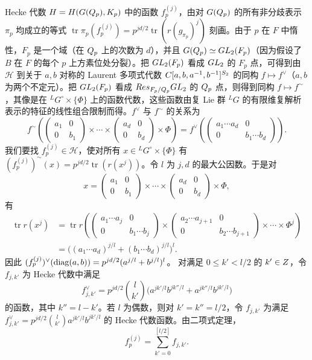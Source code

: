 Hecke 代数 $H=H(G(Q_p),K_p)$ 中的函数 $f_p^{(j)}$，由对 $G(Q_p)$ 的所有非分歧表示 $\pi_p$ 均成立的等式
$\operatorname{tr}\pi_p(f_p^{(j)})=p^{jd/2}\operatorname{tr}(r(g_{\pi_p})^j)$ 刻画。由于 $p$ 在 $F$ 中惰性，$F_p$ 是一个域（在 $Q_p$ 上的次数为 $d$），并且 $G(Q_p)\simeq GL_2(F_p)$（因为假设了 $B$ 在 $F$ 的每个 $p$ 上方素位处分裂）。把 $GL_2(F_p)$ 看成 $GL_2$ 的 $F_p$ 点，可得到由 $\mathcal H$ 到关于 $a,b$ 对称的 Laurent 多项式代数 $C[a,b,a^{-1},b^{-1}]^{S_2}$ 的同构 $f\mapsto f^\vee$（$a,b$ 为两个不定元）。把 $GL_2(F_p)$ 看成 $Res_{F_p/Q_p}GL_2$ 的 $Q_p$ 点，则得到同构 $f\mapsto f^\sim$，其像是在 ${}^LG^\circ\times\{\Phi\}$ 上的函数代数，这些函数由复 Lie 群 ${}^LG$ 的有限维复解析表示的特征的线性组合限制而得。$f^\vee$ 与 $f^\sim$ 的关系为
\[
f^\sim\left(\begin{pmatrix}a_1&0\\0&b_1\end{pmatrix}\times\cdots\times
\begin{pmatrix}a_d&0\\0&b_d\end{pmatrix}\times\Phi\right)
=f^\vee\left(\begin{pmatrix}a_1\cdots a_d&0\\0&b_1\cdots b_d\end{pmatrix}\right).
\]
我们要找 $f_p^{(j)}\in\mathcal H$，使对所有 $x\in{}^LG^\circ\times\{\Phi\}$ 有
$(f_p^{(j)})^\sim(x)=p^{jd/2}\operatorname{tr}(r(x^j))$。令 $l$ 为 $j,d$ 的最大公因数。于是对
\[
x=\begin{pmatrix}a_1&0\\0&b_1\end{pmatrix}\times\cdots\times
\begin{pmatrix}a_d&0\\0&b_d\end{pmatrix}\times\Phi,
\]
有
\begin{align*}
\operatorname{tr}r(x^j)&=\operatorname{tr}r\left(
\begin{pmatrix}a_1\cdots a_j&0\\0&b_1\cdots b_j\end{pmatrix}
\times\begin{pmatrix}a_2\cdots a_{j+1}&0\\0&b_2\cdots b_{j+1}\end{pmatrix}
\times\cdots\times\Phi^j\right)\\
&=\big((a_1\cdots a_d)^{j/l}+(b_1\cdots b_d)^{j/l}\big)^l.
\end{align*}
因此
$(f_p^{(j)})^\vee(\diag(a,b))=p^{jd/2}(a^{j/l}+b^{j/l})^l$。
对满足 $0\le k'<l/2$ 的 $k'\in Z$，令 $f_{j,k'}$ 为 Hecke 代数中满足
\[
f_{j,k'}^\vee=p^{jd/2}\binom l{k'}\big(a^{jk'/l}b^{jk''/l}+a^{jk''/l}b^{jk'/l}\big)
\]
的函数，其中 $k''=l-k'$。若 $l$ 为偶数，则对 $k'=k''=l/2$，令 $f_{j,k'}$ 为满足
$f_{j,k'}^\vee=p^{jd/2}\binom l{k'}a^{jk'/l}b^{jk'/l}$ 的 Hecke 代数函数。由二项式定理，
\[
f_p^{(j)}=\sum_{k'=0}^{[l/2]}f_{j,k'}.
\]

